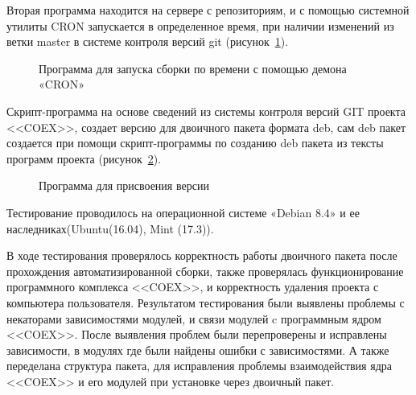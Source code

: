 Вторая программа находится на сервере с репозиториям, и с помощью системной утилиты CRON запускается в определенное время, при наличии изменений из ветки master в системе контроля версий git (рисунок~\ref{ser_2:ser_2}).

\begin{figure}[!ht]
\caption{ Программа  для запуска сборки по времени  с помощью демона  «CRON» }
\label{ser_2:ser_2}
\end{figure}

Скрипт-программа на основе сведений из системы контроля версий GIT проекта <<COEX>>, создает версию для двоичного пакета формата deb, сам deb пакет создается при помощи скрипт-программы по созданию  deb пакета из тексты программ проекта (рисунок~\ref{ser_3:ser_3}).

\begin{figure}[!ht]
\caption{ Программа для присвоения версии }
\label{ser_3:ser_3}
\end{figure}

Тестирование проводилось на операционной системе «Debian 8.4» и ее наследниках(Ubuntu(16.04), Mint (17.3)).

В ходе тестирования проверялось корректность работы двоичного пакета после прохождения автоматизированной сборки, также проверялась функционирование программного комплекса <<COEX>>, и корректность удаления проекта с компьютера пользователя. Результатом тестирования были выявлены проблемы с некаторами зависимостями модулей, и связи модулей c программным ядром <<COEX>>. После выявления проблем были перепроверены и исправлены зависимости, в модулях где были найдены ошибки с зависимостями. А также переделана структура пакета, для исправления проблемы взаимодействия ядра <<COEX>> и его модулей при установке через двоичный пакет.  

\clearpage
